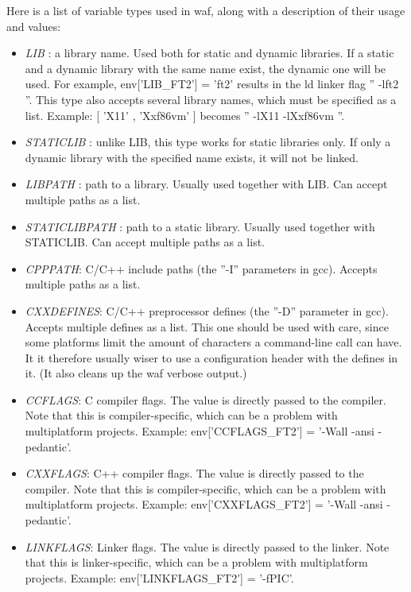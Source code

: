 \documentclass[a4,10pt]{article}
\begin{document}
Here is a list of variable types used in waf, along with a description of their usage and values:\\
\begin{itemize}
	\item \emph{LIB} : a library name. Used both for static and dynamic libraries. If a static and a dynamic library with the same name exist, the dynamic one will be used. For example, env['LIB\_FT2'] = 'ft2' results in the ld linker flag '' -lft2 ''. This type also accepts several library names, which must be specified as a list. Example: [ 'X11' , 'Xxf86vm' ] becomes '' -lX11 -lXxf86vm ''.
	\item \emph{STATICLIB} : unlike LIB, this type works for static libraries only. If only a dynamic library with the specified name exists, it will not be linked.
	\item \emph{LIBPATH} : path to a library. Usually used together with LIB. Can accept multiple paths as a list.
	\item \emph{STATICLIBPATH} : path to a static library. Usually used together with STATICLIB. Can accept multiple paths as a list.
	\item \emph{CPPPATH}: C/C++ include paths (the ''-I'' parameters in gcc). Accepts multiple paths as a list.
	\item \emph{CXXDEFINES}: C/C++ preprocessor defines (the ''-D'' parameter in gcc). Accepts multiple defines as a list. This one should be used with care, since some platforms limit the amount of characters a command-line call can have. It it therefore usually wiser to use a configuration header with the defines in it. (It also cleans up the waf verbose output.)
	\item \emph{CCFLAGS}: C compiler flags. The value is directly passed to the compiler. Note that this is compiler-specific, which can be a problem with multiplatform projects. Example: env['CCFLAGS\_FT2'] = '-Wall -ansi -pedantic'.
	\item \emph{CXXFLAGS}: C++ compiler flags. The value is directly passed to the compiler. Note that this is compiler-specific, which can be a problem with multiplatform projects. Example: env['CXXFLAGS\_FT2'] = '-Wall -ansi -pedantic'.
	\item \emph{LINKFLAGS}: Linker flags. The value is directly passed to the linker. Note that this is linker-specific, which can be a problem with multiplatform projects. Example: env['LINKFLAGS\_FT2'] = '-fPIC'.
\end{itemize}
\end{document}
